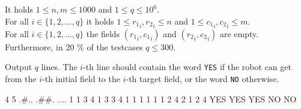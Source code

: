 \bigskip
\noindent
It holds $1 \leq n, m \leq 1000$ and $1 \leq q \leq 10^6$.\\
For all $i \in \{ 1, 2, \ldots, q \}$ it holds $1 \leq {r_1}_i, {r_2}_i \leq n$ and $1 \leq {c_1}_i, {c_2}_i \leq m$.\\
For all $i \in \{ 1, 2, \ldots, q \}$ the fields $({r_1}_i, {c_1}_i)$ and $({r_2}_i, {c_2}_i)$ are empty.\\
Furthermore, in 20 \% of the testcases $q \leq 300$.


Output $q$ lines. The $i$-th line should contain the word \texttt{YES} if the robot can get from the $i$-th initial field to the $i$-th target field, or the word \texttt{NO} otherwise.


 4 5
.#..
.##.
....
1 1 3 4
1 3 3 4
1 1 1 1
1 1 2 4
2 1 2 4
\sampleOUT
YES
YES
YES
NO
NO
\sampleEND


